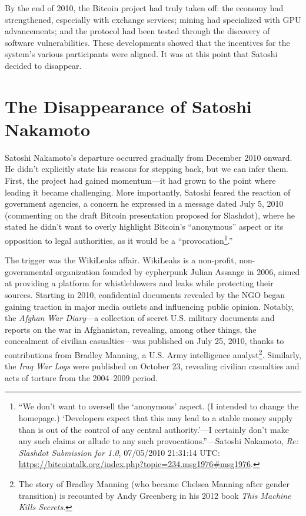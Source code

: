 \documentclass[
  a5paper,
  smalldemyvopaper,10pt,twoside,onecolumn,openright,extrafontsizes,hidelinks]{memoir}
\begin{document}
By the end of 2010, the Bitcoin project had truly taken off: the economy
had strengthened, especially with exchange services; mining had
specialized with GPU advancements; and the protocol had been tested
through the discovery of software vulnerabilities. These developments
showed that the incentives for the system's various participants were
aligned. It was at this point that Satoshi decided to disappear.

\section*{The Disappearance of Satoshi
Nakamoto}\label{la-disparition-de-satoshi-nakamoto}


Satoshi Nakamoto's departure occurred gradually from December 2010
onward. He didn't explicitly state his reasons for stepping back, but we
can infer them. First, the project had gained momentum---it had grown to
the point where leading it became challenging. More importantly, Satoshi
feared the reaction of government agencies, a concern he expressed in a
message dated July 5, 2010 (commenting on the draft Bitcoin presentation
proposed for Slashdot), where he stated he didn't want to overly
highlight Bitcoin's ``anonymous'' aspect or its opposition to legal
authorities, as it would be a ``provocation\footnote{``We don't want to
  oversell the `anonymous' aspect. (I intended to change the homepage.)
  `Developers expect that this may lead to a stable money supply than is
  out of the control of any central authority.'---I certainly don't make
  any such claims or allude to any such provocations.''---Satoshi
  Nakamoto, \emph{Re: Slashdot Submission for 1.0}, 07/05/2010 21:31:14
  UTC:
  \url{https://bitcointalk.org/index.php?topic=234.msg1976\#msg1976}.}.''

The trigger was the WikiLeaks affair. WikiLeaks is a non-profit,
non-governmental organization founded by cypherpunk Julian Assange in
2006, aimed at providing a platform for whistleblowers and leaks while
protecting their sources. Starting in 2010, confidential documents
revealed by the NGO began gaining traction in major media outlets and
influencing public opinion. Notably, the \emph{Afghan War Diary}---a
collection of secret U.S. military documents and reports on the war in
Afghanistan, revealing, among other things, the concealment of civilian
casualties---was published on July 25, 2010, thanks to contributions
from Bradley Manning, a U.S. Army intelligence analyst\footnote{The
  story of Bradley Manning (who became Chelsea Manning after gender
  transition) is recounted by Andy Greenberg in his 2012 book \emph{This
  Machine Kills Secrets}.}. Similarly, the \emph{Iraq War Logs} were
published on October 23, revealing civilian casualties and acts of
torture from the 2004--2009 period.
\end{document}
